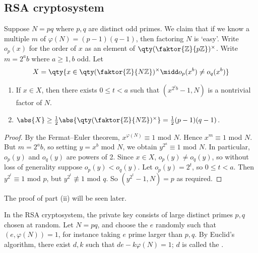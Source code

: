 \subsection{RSA cryptosystem}
Suppose $N = pq$ where $p, q$ are distinct odd primes.
We claim that if we know a multiple $m$ of $\varphi(N) = (p-1)(q-1)$, then factoring $N$ is `easy'.
Write $o_p(x)$ for the order of $x$ as an element of $\qty(\faktor{\mathbb Z}{p\mathbb Z})^\times$.
Write $m = 2^a b$ where $a \geq 1, b$ odd.
Let
\begin{align*}
    X = \qty{x \in \qty(\faktor{\mathbb Z}{N\mathbb Z})^\times \midd o_p(x^b) \neq o_q(x^b)}
\end{align*}
\begin{theorem}
    \begin{enumerate}
        \item If $x \in X$, then there exists $0 \leq t < a$ such that $(x^{2^t b} - 1, N)$ is a nontrivial factor of $N$.
        \item $\abs{X} \geq \frac{1}{2} \abs{\qty(\faktor{\mathbb Z}{N\mathbb Z})^\times} = \frac{1}{2}(p-1)(q-1)$.
    \end{enumerate}
\end{theorem}
\begin{proof}
    By the Fermat--Euler theorem, $x^{\varphi(N)} \equiv 1$ mod $N$.
    Hence $x^m \equiv 1$ mod $N$.
    But $m = 2^a b$, so setting $y = x^b$ mod $N$, we obtain $y^{2^a} \equiv 1$ mod $N$.
    In particular, $o_p(y)$ and $o_q(y)$ are powers of 2.
    Since $x \in X$, $o_p(y) \neq o_q(y)$, so without loss of generality suppose $o_p(y) < o_q(y)$.
    Let $o_p(y) = 2^t$, so $0 \leq t < a$.
    Then $y^{2^t} \equiv 1$ mod $p$, but $y^{2^t} \not\equiv 1$ mod $q$.
    So $(y^{2^t} - 1, N) = p$ as required.
\end{proof}
The proof of part (ii) will be seen later.

In the RSA cryptosystem, the private key consists of large distinct primes $p, q$ chosen at random.
Let $N = pq$, and choose the  $e$ randomly such that $(e, \varphi(N)) = 1$, for instance taking $e$ prime larger than $p, q$.
By Euclid's algorithm, there exist $d, k$ such that $de - k\varphi(N) = 1$; $d$ is called the .

